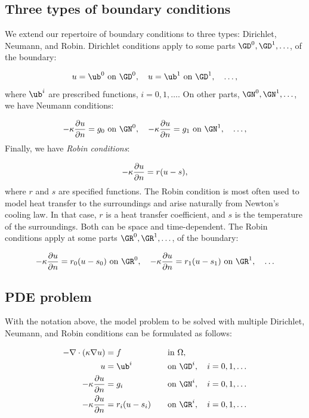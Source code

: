 \documentclass[graybox,envcountchap,sectrefs,final]{svmonodo}
\begin{document}
\subsection{Three types of boundary conditions}

We extend our repertoire of boundary conditions to three types:
Dirichlet, Neumann, and Robin. Dirichlet conditions apply to some
parts $\GD^0, \GD^1, \ldots$, of the boundary:

\[ u = \ub^0\hbox{ on }\GD^0,\quad
   u = \ub^1\hbox{ on }\GD^1, \quad \ldots,\]
where $\ub^i$ are prescribed functions, $i=0,1,\ldots$.
On other parts, $\GN^0, \GN^1, \ldots$, we have
Neumann conditions:

\[ -\kappa{\partial u\over\partial n} = g_{0}\hbox{ on }\GN^0,\quad
-\kappa{\partial u\over\partial n} = g_{1}\hbox{ on }\GN^1,\quad \ldots,
\]
Finally, we have \emph{Robin conditions}:

\begin{equation*}
-\kappa{\partial u\over\partial n} = r(u-s),
\label{ch:poisson0:multi:bc:Robin}
\end{equation*}
where $r$ and $s$ are specified functions.  The Robin condition is
most often used to model heat transfer to the surroundings and arise
naturally from Newton's cooling law. In that case, $r$ is a heat
transfer coefficient, and $s$ is the temperature of the
surroundings. Both can be space and time-dependent.
The Robin conditions apply
at some parts $\GR^0, \GR^1, \ldots$, of the boundary:

\[ -\kappa{\partial u\over\partial n} = r_0(u-s_0)\hbox{ on }\GR^0,\quad
-\kappa{\partial u\over\partial n} = r_1(u-s_1)\hbox{ on }\GR^1,\quad \ldots
\]

\subsection{PDE problem}

With the notation above, the model problem to be solved with multiple
Dirichlet, Neumann, and Robin conditions can be formulated as follows:

\begin{alignat}{2}
-\nabla\cdot(\kappa\nabla u) &= f \quad&&\mbox{in } \Omega, \label{ch:poisson0:2D:DN3}\\
u &= \ub^i &&\mbox{on } \GD^i,\quad i=0,1,\ldots
\label{ch:poisson0:2D:DN3:bcD}\\
-\kappa{\partial u\over\partial n} &= g_i &&\mbox{on } \GN^i,\quad
i=0,1,\ldots
\label{ch:poisson0:2D:DN3:bcN}\\
-\kappa{\partial u\over\partial n} &= r_i(u-s_i) \quad&&\mbox{on } \GR^i,\quad
i=0,1,\ldots
\label{ch:poisson0:2D:DN3:bcR}
\end{alignat}
\end{document}
